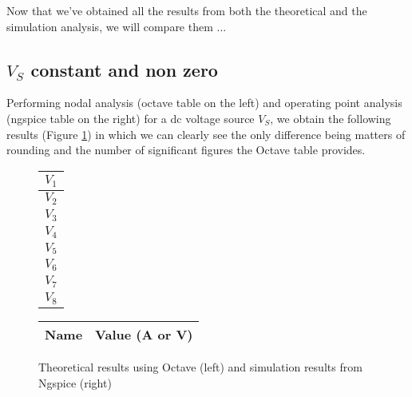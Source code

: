 \label{sec:comp}
\hspace{12pt} Now that we've obtained all the results from both the theoretical and the simulation analysis, we will compare them ...
\subsection{$V_S$ constant and non zero}
\hspace{12pt} Performing nodal analysis (octave table on the left) and operating point analysis (ngspice table on the right) for a dc voltage source $V_S$, we obtain the following results (Figure \ref{comp1}) in which we can clearly see the only difference being matters of rounding and the number of significant figures the Octave table provides.

\begin{figure}[h]
	\begin{minipage}{.3\textwidth}
		\flushright
		\begin{tabular}{|c|}
		    \hline
		    $V_1$ \\
		    \hline
		    $V_2$ \\
		    \hline
		    $V_3$ \\
		    \hline
		    $V_4$ \\
		    \hline
		    $V_5$ \\
		    \hline
		    $V_6$ \\
		    \hline
		    $V_7$ \\
		    \hline
		    $V_8$ \\
		    \hline
		\end{tabular}
	\end{minipage}	
	\hspace{-8pt}
	\begin{minipage}{.3\textwidth}
		\flushleft
		
	\end{minipage}
	\hspace{10pt}
	\begin{minipage}{.3\textwidth}
		\begin{tabular}{|c|c|}
			\hline
			\textbf{Name} & \textbf{Value (A or V)} \\
			\hline
			
		\end{tabular}
	\end{minipage}
	\caption{Theoretical results using Octave (left) and simulation results from Ngspice (right)}    
	\label{comp1}
\end{figure}
\pagebreak
